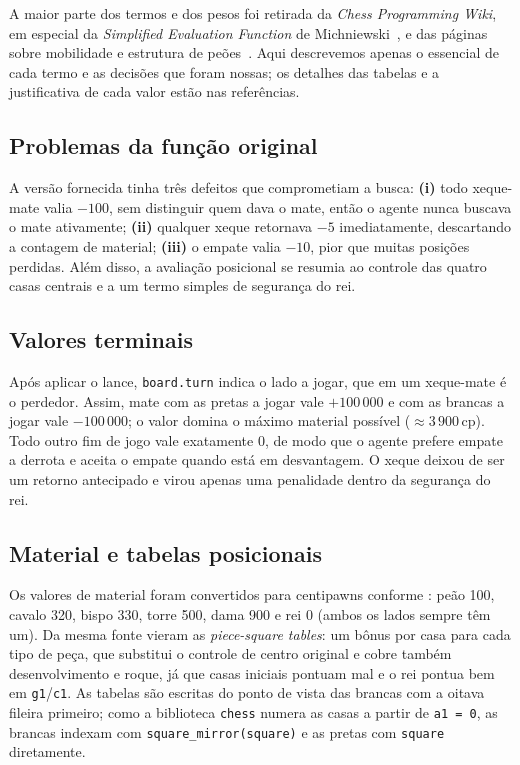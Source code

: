 \documentclass[12pt,a4paper]{article}
\newcommand{\cp}{\,\text{cp}}
\begin{document}
A maior parte dos termos e dos pesos foi retirada da \emph{Chess
Programming Wiki}, em especial da \emph{Simplified Evaluation Function}
de Michniewski~\cite{cpw-sef}, e das páginas sobre mobilidade e estrutura
de peões~\cite{cpw-mobility,cpw-pawn}. Aqui descrevemos apenas o
essencial de cada termo e as decisões que foram nossas; os detalhes das
tabelas e a justificativa de cada valor estão nas referências.

\subsection{Problemas da função original}

A versão fornecida tinha três defeitos que comprometiam a busca:
\textbf{(i)} todo xeque-mate valia $-100$, sem distinguir quem dava o
mate, então o agente nunca buscava o mate ativamente;
\textbf{(ii)} qualquer xeque retornava $-5$ imediatamente, descartando a
contagem de material;
\textbf{(iii)} o empate valia $-10$, pior que muitas posições perdidas.
Além disso, a avaliação posicional se resumia ao controle das quatro
casas centrais e a um termo simples de segurança do rei.

\subsection{Valores terminais}

Após aplicar o lance, \texttt{board.turn} indica o lado a jogar, que em
um xeque-mate é o perdedor. Assim, mate com as pretas a jogar vale
$+100\,000$ e com as brancas a jogar vale $-100\,000$; o valor domina o
máximo material possível ($\approx 3\,900\cp$). Todo outro fim de jogo
vale exatamente $0$, de modo que o agente prefere empate a derrota e
aceita o empate quando está em desvantagem. O xeque deixou de ser um
retorno antecipado e virou apenas uma penalidade dentro da segurança do
rei.

\subsection{Material e tabelas posicionais}

Os valores de material foram convertidos para centipawns conforme
\cite{cpw-sef}: peão 100, cavalo 320, bispo 330, torre 500, dama 900 e
rei 0 (ambos os lados sempre têm um). Da mesma fonte vieram as
\emph{piece-square tables}: um bônus por casa para cada tipo de peça,
que substitui o controle de centro original e cobre também
desenvolvimento e roque, já que casas iniciais pontuam mal e o rei
pontua bem em \texttt{g1}/\texttt{c1}. As tabelas são escritas do ponto
de vista das brancas com a oitava fileira primeiro; como a biblioteca
\texttt{chess} numera as casas a partir de \texttt{a1 = 0}, as brancas
indexam com \texttt{square\_mirror(square)} e as pretas com
\texttt{square} diretamente.
\end{document}

